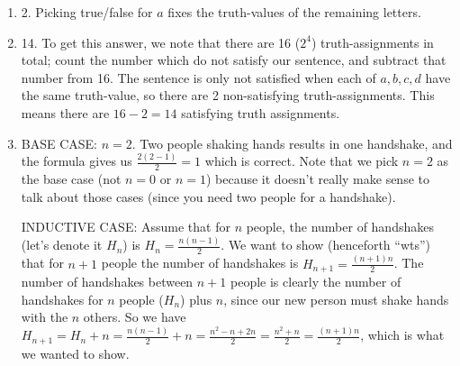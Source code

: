 \begin{mdframed}[linewidth=1]
\begin{enumerate}
    \item 2. Picking true/false for $a$ fixes the truth-values of the remaining letters. 

    \item 14. To get this answer, we note that there are 16 ($2^4$) truth-assignments in total; count the number which do not satisfy our sentence, and subtract that number from 16. The sentence is only not satisfied when each of $a, b, c, d$ have the same truth-value, so there are 2 non-satisfying truth-assignments. This means there are $16 - 2 = 14$ satisfying truth assignments. 

    \item BASE CASE: $n = 2$. Two people shaking hands results in one handshake, and the formula gives us $\frac{2(2-1)}{2} = 1$ which is correct. Note that we pick $n = 2$ as the base case (not $n = 0$ or $n = 1$) because it doesn't really make sense to talk about those cases (since you need two people for a handshake). 

    INDUCTIVE CASE: Assume that for $n$ people, the number of handshakes (let's denote it $H_n$) is $H_n = \frac{n(n-1)}{2}$. We want to show (henceforth ``wts'') that for $n + 1$ people the number of handshakes is $H_{n+1} = \frac{(n+1)n}{2}$. The number of handshakes between $n + 1$ people is clearly the number of handshakes for $n$ people ($H_n$) plus $n$, since our new person must shake hands with the $n$ others. So we have $H_{n+1} = H_n + n = \frac{n(n-1)}{2} + n = \frac{n^2 - n + 2n}{2} = \frac{n^2 + n}{2} = \frac{(n+1)n}{2}$, which is what we wanted to show. 

\end{enumerate}
\end{mdframed}